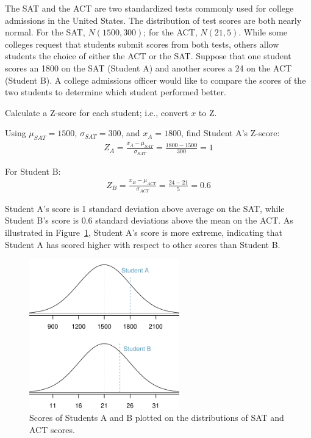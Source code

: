 \begin{example}{The SAT and the ACT are two standardized tests commonly used for college admissions in the United States. The distribution of test scores are both nearly normal. For the SAT, $N(1500, 300)$; for the ACT, $N(21, 5)$. While some colleges request that students submit scores from both tests, others allow students the choice of either the ACT or the SAT. Suppose that one student scores an 1800 on the SAT (Student A) and another scores a 24 on the ACT (Student B). A college admissions officer would like to compare the scores of the two students to determine which student performed better.}\label{actSAT}
		
Calculate a Z-score for each student; i.e., convert $x$ to Z.
		
Using $\mu_{SAT}=1500$, $\sigma_{SAT}=300$, and $x_{A}=1800$, find Student A's Z-score:
\begin{align*}
	Z_{A} = \frac{x_{A} - \mu_{SAT}}{\sigma_{SAT}} = \frac{1800-1500}{300} = 1
\end{align*}

For Student B:
\begin{align*}
	Z_{B} = \frac{x_{B} - \mu_{ACT}}{\sigma_{ACT}} = \frac{24 - 21}{5} = 0.6
\end{align*}

Student A's score is 1 standard deviation above average on the SAT, while Student B's score is 0.6 standard deviations above the mean on the ACT. As illustrated in Figure~\ref{satActNormals}, Student A's score is more extreme, indicating that Student A has scored higher with respect to other scores than Student B.
\end{example}

\begin{figure}[h]
\centering
\includegraphics[width=65mm]{ch_distributions_oi_biostat/figures/satActNormals/satActNormals}
\caption{Scores of Students A and B plotted on the distributions of SAT and ACT scores.}
\label{satActNormals}
\end{figure}

